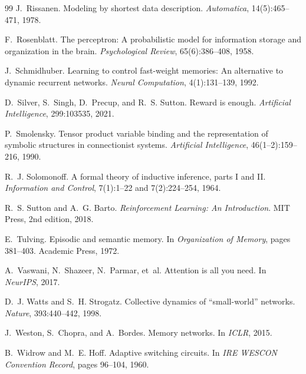 \documentclass[11pt,a4paper]{article}
\theoremstyle{plain}
\theoremstyle{definition}
\theoremstyle{remark}
\begin{document}
\begin{thebibliography}{99}
J.~Rissanen.
\newblock Modeling by shortest data description.
\newblock \emph{Automatica}, 14(5):465--471, 1978.

F.~Rosenblatt.
\newblock The perceptron: A probabilistic model for information storage and
organization in the brain.
\newblock \emph{Psychological Review}, 65(6):386--408, 1958.

J.~Schmidhuber.
\newblock Learning to control fast-weight memories: An alternative to dynamic
recurrent networks.
\newblock \emph{Neural Computation}, 4(1):131--139, 1992.

D.~Silver, S.~Singh, D.~Precup, and R.~S. Sutton.
\newblock Reward is enough.
\newblock \emph{Artificial Intelligence}, 299:103535, 2021.

P.~Smolensky.
\newblock Tensor product variable binding and the representation of symbolic
structures in connectionist systems.
\newblock \emph{Artificial Intelligence}, 46(1--2):159--216, 1990.

R.~J. Solomonoff.
\newblock A formal theory of inductive inference, parts I and II.
\newblock \emph{Information and Control}, 7(1):1--22 and 7(2):224--254, 1964.

R.~S. Sutton and A.~G. Barto.
\newblock \emph{Reinforcement Learning: An Introduction}.
\newblock MIT Press, 2nd edition, 2018.

E.~Tulving.
\newblock Episodic and semantic memory.
\newblock In \emph{Organization of Memory}, pages 381--403. Academic Press,
1972.

A.~Vaswani, N.~Shazeer, N.~Parmar, et~al.
\newblock Attention is all you need.
\newblock In \emph{NeurIPS}, 2017.

D.~J. Watts and S.~H. Strogatz.
\newblock Collective dynamics of ``small-world'' networks.
\newblock \emph{Nature}, 393:440--442, 1998.

J.~Weston, S.~Chopra, and A.~Bordes.
\newblock Memory networks.
\newblock In \emph{ICLR}, 2015.

B.~Widrow and M.~E. Hoff.
\newblock Adaptive switching circuits.
\newblock In \emph{IRE WESCON Convention Record}, pages 96--104, 1960.


\end{thebibliography}
\end{document}
